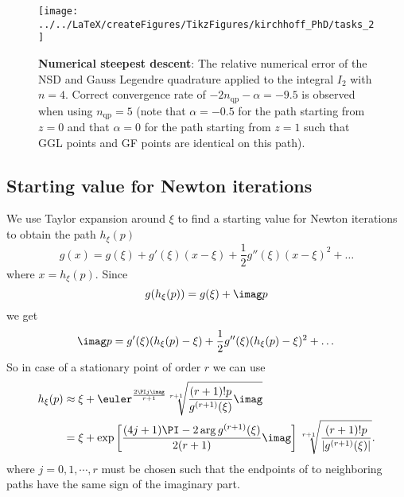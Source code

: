 \begin{figure}
	\centering
	\texttt{[image: ../../LaTeX/createFigures/TikzFigures/kirchhoff\_PhD/tasks\_2]}
	\caption{\textbf{Numerical steepest descent}: The relative numerical error of the NSD and Gauss Legendre quadrature applied to the integral $I_2$ with $n=4$. Correct convergence rate of $-2n_{\mathrm{qp}}-\alpha=-9.5$ is observed when using $n_{\mathrm{qp}}=5$ (note that $\alpha=-0.5$ for the path starting from $z=0$ and that $\alpha=0$ for the path starting from $z=1$ such that GGL points and GF points are identical on this path).}
	\label{Fig4:tasks_2}
\end{figure}

\subsection{Starting value for Newton iterations}
We use Taylor expansion around $\xi$ to find a starting value for Newton iterations to obtain the path $h_\xi(p)$
\begin{equation*}
	g(x) = g(\xi) + g'(\xi)(x-\xi) + \frac{1}{2}g''(\xi)(x-\xi)^2 + \dots
\end{equation*}
where $x=h_\xi(p)$. Since 
\begin{equation}\label{Eq4:path}
	g(h_\xi(p)) = g(\xi)+\imag p
\end{equation}
we get
\begin{equation*}
	\imag p = g'(\xi)(h_\xi(p)-\xi) + \frac{1}{2}g''(\xi)(h_\xi(p)-\xi)^2 + \dots
\end{equation*}
So in case of a stationary point of order $r$ we can use
\begin{align*}
	h_\xi(p) &\approx \xi + \euler^{\frac{2\PI j\imag}{r+1}}\sqrt[r+1]{\frac{(r+1)!p}{g^{(r+1)}(\xi)}\imag} \\
	&= \xi + \exp\left[\frac{(4j+1)\PI  - 2\arg{g^{(r+1)}(\xi)}}{2(r+1)}\imag\right]\sqrt[r+1]{\frac{(r+1)!p}{|g^{(r+1)}(\xi)|}}.
\end{align*}
where $j=0,1,\cdots,r$ must be chosen such that the endpoints of to neighboring paths have the same sign of the imaginary part.

